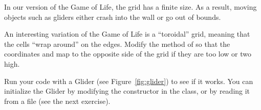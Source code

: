 \begin{exercise}
In our version of the Game of Life, the grid has a finite size.
As a result, moving objects such as gliders either crash into the wall or go out of bounds.

An interesting variation of the Game of Life is a ``toroidal'' grid, meaning that the cells ``wrap around'' on the edges.
Modify the  method of  so that the coordinates  and  map to the opposite side of the grid if they are too low or two high.

Run your code with a Glider (see Figure~\ref{fig:glider}) to see if it works.
You can initialize the Glider by modifying the constructor in the  class, or by reading it from a file (see the next exercise).
\end{exercise}





